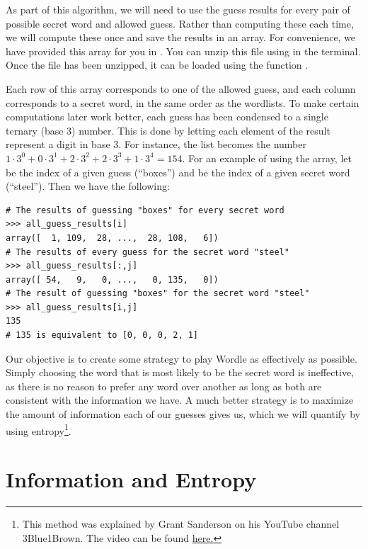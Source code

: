 As part of this algorithm, we will need to use the guess results for every pair of possible secret word and allowed guess.
Rather than computing these each time, we will compute these once and save the results in an array.
For convenience, we have provided this array for you in .
You can unzip this file using  in the terminal.
Once the file has been unzipped, it can be loaded using the function .

Each row of this array corresponds to one of the allowed guess, and each column corresponds to a secret word, in the same order as the wordlists.
To make certain computations later work better, each guess has been condensed to a single ternary (base 3) number.
This is done by letting each element of the result represent a digit in base 3.
For instance, the list \li{[1,0,2,2,1]} becomes the number \(1\cdot 3^0 + 0\cdot 3^1+2\cdot 3^2+2\cdot 3^3+1\cdot 3^4=154\).
For an example of using the array, let  be the index of a given guess (``boxes'') and  be the index of a given secret word (``steel'').
Then we have the following:
\begin{lstlisting}
# The results of guessing "boxes" for every secret word
>>> all_guess_results[i]
array([  1, 109,  28, ...,  28, 108,   6])
# The results of every guess for the secret word "steel"
>>> all_guess_results[:,j]
array([ 54,   9,   0, ...,   0, 135,   0])
# The result of guessing "boxes" for the secret word "steel"
>>> all_guess_results[i,j]
135
# 135 is equivalent to [0, 0, 0, 2, 1]
\end{lstlisting}

Our objective is to create some strategy to play Wordle as effectively as possible.
Simply choosing the word that is most likely to be the secret word is ineffective, as there is no reason to prefer any word over another as long as both are consistent with the information we have.
A much better strategy is to maximize the amount of information each of our guesses gives us, which we will quantify by using entropy\footnote{This method was explained by Grant Sanderson on his YouTube channel 3Blue1Brown. The video can be found \href{https://youtu.be/v68zYyaEmEA?si=4ac5QErmPipLOAUw}{here.}}.


\section*{Information and Entropy}

